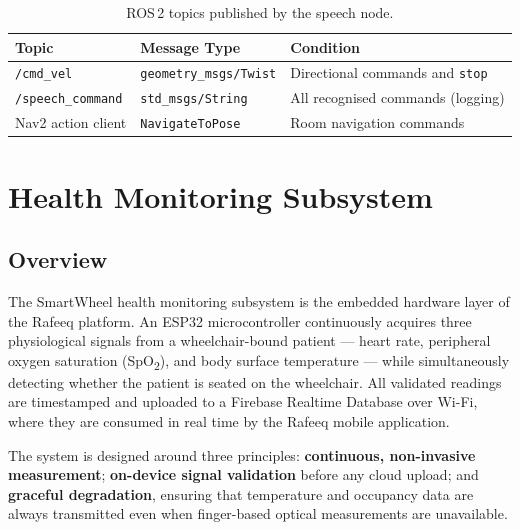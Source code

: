 \documentclass[12pt,a4paper]{report}
\begin{document}
\begin{table}[H]
  \centering
  \caption{ROS\,2 topics published by the speech node.}
  \label{tab:ros_topics}
  \setlength{\tabcolsep}{9pt}
  \begin{tabular}{@{}L{4.0cm}L{3.0cm}L{5.5cm}@{}}
    \toprule
    \textbf{Topic} & \textbf{Message Type} & \textbf{Condition} \\
    \midrule
    \texttt{/cmd\_vel}           & \texttt{geometry\_msgs/Twist} & Directional commands and \texttt{stop} \\
    \texttt{/speech\_command}    & \texttt{std\_msgs/String}     & All recognised commands (logging) \\
    Nav2 action client           & \texttt{NavigateToPose}       & Room navigation commands \\
    \bottomrule
  \end{tabular}
\end{table}

\section{Health Monitoring Subsystem}
\label{sec:health}

\subsection{Overview}

The SmartWheel health monitoring subsystem is the embedded hardware layer of the Rafeeq
platform. An ESP32 microcontroller continuously acquires three physiological signals from a
wheelchair-bound patient — heart rate, peripheral oxygen saturation (SpO\textsubscript{2}),
and body surface temperature — while simultaneously detecting whether the patient is seated
on the wheelchair. All validated readings are timestamped and uploaded to a Firebase
Realtime Database over Wi-Fi, where they are consumed in real time by the Rafeeq mobile
application.

The system is designed around three principles: \textbf{continuous, non-invasive measurement};
\textbf{on-device signal validation} before any cloud upload; and \textbf{graceful degradation},
ensuring that temperature and occupancy data are always transmitted even when finger-based
optical measurements are unavailable.
\end{document}
